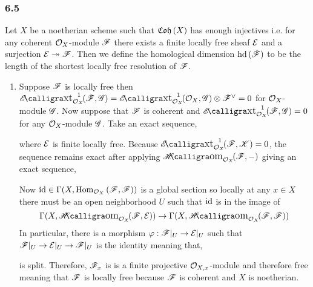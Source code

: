 \documentclass[12pt]{article}
\begin{document}
\subsubsection{6.5}

\newcommand{\hd}[1]{\mathrm{hd}\left( #1 \right)}
\newcommand{\pd}[2]{\mathrm{pd}_{#1}\left(#2 \right)}

Let $X$ be a noetherian scheme such that $\mathfrak{Coh}\left(X\right)$ has enough injectives i.e. for any coherent $\mathcal{O}_{X}$-module $\mathscr{F}$ there exists a finite locally free sheaf $\mathcal{E}$ and a surjection $\mathcal{E} \twoheadrightarrow \mathscr{F}$. Then we define the homological dimension $\hd{\F}$ to be the length of the shortest locally free resolution of $\mathscr{F}$. 

\begin{enumerate}
\item Suppose $\mathscr{F}$ is locally free then $\shExt{1}{\struct{X}}{\F}{\G} = \shExt{1}{\struct{X}}{\struct{X}}{\G} \otimes \F^\vee = 0$ for $\mathcal{O}_{X}$-module $\mathscr{G}$. Now suppose that $\mathscr{F}$ is coherent and $\shExt{1}{\struct{X}}{\F}{\G} = 0$ for any $\mathcal{O}_{X}$-module $\mathscr{G}$. Take an exact sequence,
\begin{center}
\end{center}
where $\mathcal{E}$ is finite locally free. Because $\shExt{1}{\struct{X}}{\F}{\K} = 0$, the sequence remains exact after applying $\shHom{\struct{X}}{\F}{-}$ giving an exact sequence,
\begin{center}
\end{center}
Now $\mathrm{id} \in \Gamma(X, \mathrm{Hom}_{\mathcal{O}_{X}} \left( \mathscr{F}, \mathscr{F} \right))$ is a global section so locally at any $x \in X$ there must be an open neighborhood $U$ such that $\mathrm{id}$ is in the image of
\[ \Gamma(X, \shHom{\struct{X}}{\F}{\E}) \to \Gamma(X, \shHom{\struct{X}}{\F}{\F}) \]
In particular, there is a morphism $\varphi : \mathscr{F}|_U \to \mathcal{E}|_U$ such that $\mathscr{F}|_U \to \mathcal{E}|_U \to \mathscr{F}|_U$ is the identity meaning that,
\begin{center}
\end{center}
is split. Therefore, $\mathscr{F}_x$ is is a finite projective $\mathcal{O}_{X, x}$-module and therefore free meaning that $\mathscr{F}$ is locally free because $\mathscr{F}$ is coherent and $X$ is noetherian.


\end{enumerate}
\end{document}
